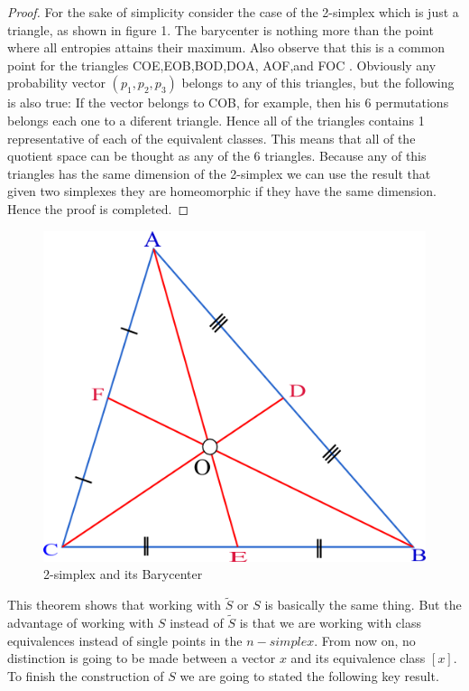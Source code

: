 \documentclass[11pt]{article}
\theoremstyle{plain}
\begin{document}
\begin{proof}
For the sake of simplicity  consider the case of the 2-simplex
which is just a triangle, as shown in figure 1. The barycenter is
nothing more than the point where all entropies attains their
maximum. Also observe that this is a common point for the
triangles COE,EOB,BOD,DOA, AOF,and FOC . Obviously any probability
vector $(p_{1},p_{2},p_{3})$ belongs to any of this triangles, but
the following is also true: If the vector belongs to COB, for
example, then his 6 permutations belongs each one to a diferent
triangle. Hence all of the triangles contains 1 representative of
each of the equivalent classes. This means that all of the
quotient space can be thought as any of the 6 triangles. Because
any of this triangles has the same dimension of the 2-simplex we
can use the result that given two simplexes they are homeomorphic
if they have the same dimension. Hence the proof is completed.
\end{proof}

\begin{figure}[H]
\centering
\includegraphics[scale=0.5]{Center}
\caption{2-simplex and its Barycenter}
\end{figure}

This theorem shows that working with $\tilde{S}$ or $S$ is basically
the same thing. But the advantage of working with $S$ instead of
$\tilde{S}$ is that we are working with class equivalences instead of single points in the $n-simplex$. From now on,  no distinction is
going to be made between a vector $x$ and its equivalence class $[x]$. To finish the construction of $S$ we are going to stated the following  key result.
\end{document}
